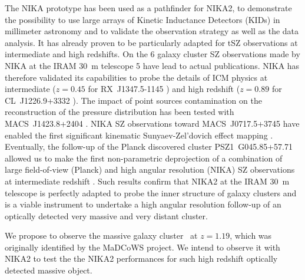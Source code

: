 \documentclass[11pt,a4paper,twoside,graphicx,color]{article}
\begin{document}
The NIKA prototype has been used as a pathfinder for NIKA2, to demonstrate the possibility to use large arrays of Kinetic Inductance Detectors (KIDs) in millimeter astronomy and to validate the observation strategy as well as the data analysis. It has already proven to be particularly adapted for tSZ observations at intermediate and high redshifts. On the 6 galaxy cluster SZ observations made by NIKA at the IRAM 30~m telescope 5 have lead to actual publications. NIKA has therefore validated its capabilities to probe the details of ICM physics at intermediate ($z=0.45$ for RX~J1347.5-1145 \cite{ada14}) and high redshift ($z=0.89$ for CL~J1226.9+3332 \cite{ada15}). The impact of point sources contamination on the reconstruction of the pressure distribution has been tested with MACS~J1423.8+2404 \cite{ada16a}. NIKA SZ observations toward MACS~J0717.5+3745 have enabled the first significant kinematic Sunyaev-Zel'dovich effect mapping \cite{ada16b}. Eventually, the follow-up of the Planck discovered cluster PSZ1~G045.85+57.71 allowed us to make the first non-parametric deprojection of a combination of large field-of-view (Planck) and high angular resolution (NIKA) SZ observations at intermediate redshift \cite{rup16}. Such results confirm that NIKA2 at the IRAM 30~m telescope is perfectly adapted to probe the inner structure of galaxy clusters and is a viable instrument to undertake a high angular resolution follow-up of an optically detected very massive and very distant cluster.

We propose to observe the massive galaxy cluster \moo\ at $z = 1.19$, which was originally identified by the MaDCoWS project. We intend to observe it with NIKA2 to test the the NIKA2 performances for such high redshift optically detected massive object. 

\end{document}
